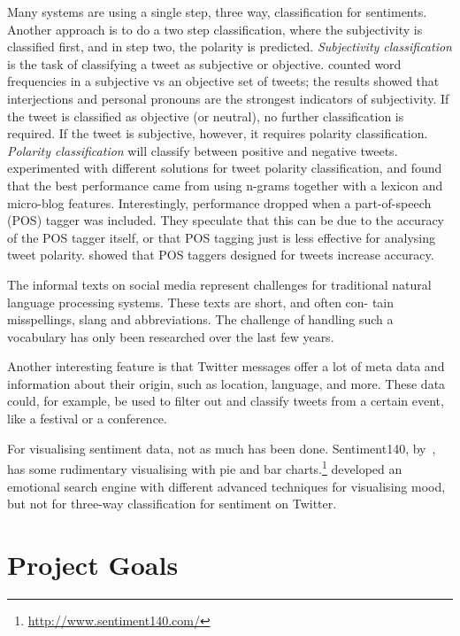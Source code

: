 Many systems are using a single step, three way, classification for sentiments. Another approach is to do a two step classification, where the subjectivity is classified first, and in step two, the polarity is predicted. \textit{Subjectivity classification} is the task of classifying a tweet as subjective or objective. \cite{article:pak} counted word frequencies in a subjective vs an objective set of tweets; the results showed that interjections and personal pronouns are the strongest indicators of subjectivity. If the tweet is classified as objective (or neutral), no further classification is required. If the tweet is subjective, however, it requires polarity classification. \textit{Polarity classification} will classify between positive and negative tweets.~\cite{article:omg} experimented with different solutions for tweet polarity classification, and found that the best performance came from using n-grams together with a lexicon and micro-blog features. Interestingly, performance dropped when a part-of-speech (POS) tagger was included. They speculate that this can be due to the accuracy of the POS tagger itself, or that POS tagging just is less effective for analysing tweet polarity. \cite{gimpel2010part} showed that POS taggers designed for tweets increase accuracy.

The informal texts on social media represent challenges for traditional natural language processing systems. These texts are short, and often con- tain misspellings, slang and abbreviations. The challenge of handling such a vocabulary has only been researched over the last few years.

Another interesting feature is that Twitter messages offer a lot of meta data and information about their origin, such as location, language, and more. These data could, for example, be used to filter out and classify tweets from a certain event, like a festival or a conference.

For visualising sentiment data, not as much has been done. Sentiment140, by~\cite{article:gimpel}, has some rudimentary visualising with pie and bar charts.\footnote{\url{http://www.sentiment140.com/}} \cite{article:wefeelfine} developed an emotional search engine with different advanced techniques for visualising mood, but not for three-way classification for sentiment on Twitter.

\section{Project Goals}
\label{sec:projectgoals}

